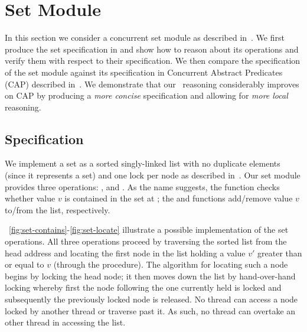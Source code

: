 \section{Set Module}\label{sec:set-example}
In this section we consider a concurrent set module as described in~\cite{cap-ecoop10}. We first produce the set specification in \colosl and show how to reason about its operations and verify them with respect to their specification. We then compare the \colosl specification of the set module against its specification in Concurrent Abstract Predicates (CAP) described in~\cite{cap-ecoop10}. We demonstrate that our \colosl\ reasoning considerably improves on CAP by producing a \emph{more concise} specification and allowing for \emph{more local} reasoning. 

\subsection*{\colosl Specification}
We implement a set as a sorted singly-linked list with no duplicate elements (since it represents a set) and one lock per node as described in~\cite{cap-ecoop10}. Our set module provides three operations: ,  and .
As the name suggests, the  function checks whether value $v$ is contained in the set at ; the  and  functions add/remove value $v$ to/from the list, respectively.

\fig~\ref{fig:set-contains}-\ref{fig:set-locate} illustrate a possible implementation of the set operations. All three operations proceed by traversing the sorted list from the head address and locating the first node in the list holding a value $v'$ greater than or equal to $v$ (through the  procedure). The algorithm for locating such a node begins by locking the head node; it then moves down the list by hand-over-hand locking whereby first the node following the one currently held is locked and subsequently the previously locked node is released. No thread can access a node locked by another thread or traverse past it. As such, no thread can overtake an other thread in accessing the list. 
%


%


